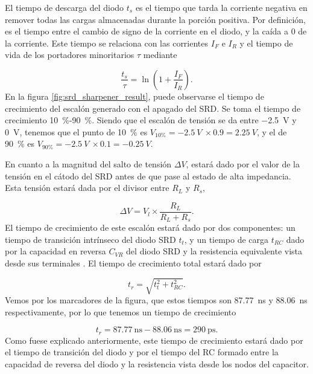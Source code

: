 El tiempo de descarga del diodo $t_s$ es el tiempo que tarda la corriente
negativa en remover todas las cargas almacenadas durante la porción positiva.
Por definición, es el tiempo entre el cambio de signo de la corriente en el
diodo, y la caída a $0$ de la corriente. Este tiempo se relaciona con las
corrientes $I_F$ e $I_R$ y el tiempo de vida de los portadores minoritarios
$\tau$ mediante \cite{an918}

\begin{equation}
    \frac{t_s}{\tau} = \ln \left( 1 + \frac{I_F}{I_R} \right).
\end{equation}
En la figura \ref{fig:srd_sharpener_result}, puede observarse el
tiempo de crecimiento del escalón generado con el apagado del SRD. Se
toma el tiempo de crecimiento \qty{10}{\percent}-\qty{90}{\percent}. Siendo que
el escalón de tensión se da entre \qty{-2.5}{\volt} y \qty{0}{\volt}, tenemos
que el punto de \qty{10}{\percent} es $V_{10\%} = -2.5 \ V \ \times 0.9 =  2.25 \
V$, y el de \qty{90}{\percent} es $V_{90\%} = -2.5 \ V \ \times 0.1 =  -0.25 \
V$.

En cuanto a la magnitud del salto de tensión $\Delta V$, estará dado por el
valor de la tensión en el cátodo del SRD antes de que pase al estado de
alta impedancia. Esta tensión estará dada por el divisor entre $R_L$ y $R_s$,

\begin{equation}
    \Delta V = V_l \times \frac{R_L}{R_L+R_s}.
\end{equation}
El tiempo de crecimiento de este escalón estará dado por dos componentes: un
tiempo de transición intrínseco del diodo SRD $t_t$, y un tiempo de carga $t_{RC}$  dado por la
capacidad en reversa $C_{VR}$ del diodo SRD y la resistencia equivalente vista desde sus terminales \cite{an918}. El tiempo de crecimiento total estará dado por

\begin{equation}
    t_r = \sqrt{t_t^2+t_{RC}^2}.
\end{equation}
Vemos por los marcadores de la figura, que estos tiempos son
\qty{87.77}{\nano\second} y \qty{88.06}{\nano\second} respectivamente, por lo
que tenemos un tiempo de crecimiento

\begin{equation}
    t_r = \qty{87.77}{\nano\second} - \qty{88.06}{\nano\second} =
    \qty{290}{\pico\second}.
\end{equation}
Como fuese explicado anteriormente, este tiempo de crecimiento estará dado por
el tiempo de transición del diodo y por el tiempo del RC formado entre la
capacidad de reversa del diodo y la resistencia vista desde los nodos del
capacitor.

